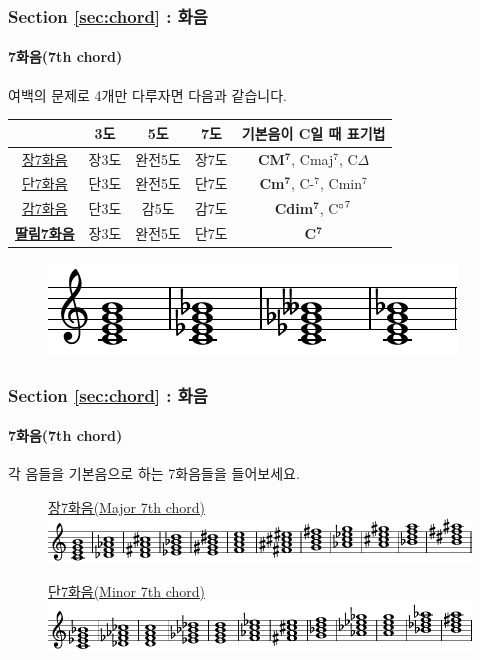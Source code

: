 \documentclass{beamer}
\begin{document}
	\begin{frame}
		\frametitle{Section \ref{sec:chord} : 화음}
		\framesubtitle{7화음(7th chord)}
		여백의 문제로 4개만 다루자면 다음과 같습니다.
		\begin{table}
			\begin{tabular}{|c|c|c|c|c|}
				\hline
				& 3도 & 5도 & 7도 & 기본음이 C일 때 표기법 \\ \hline
				\color{cyan}\href{run:res/mp3/9/chord/7th/C_major_7.mp3}{장7화음} & 장3도 & 완전5도 & 장7도 & {\bf CM$\mathbf{^7}$}, Cmaj$^7$,  C$\Delta$\\ \hline
				\color{cyan}\href{run:res/mp3/9/chord/7th/C_minor_7.mp3}{단7화음} & 단3도 & 완전5도 & 단7도 &{\bf Cm$\mathbf{^7}$}, C-$^7$, Cmin$^7$\\ \hline
				\color{cyan}\href{run:res/mp3/9/chord/7th/C_diminished_7.mp3}{감7화음} & 단3도 & 감5도 & 감7도 & {\bf Cdim$\mathbf{^7}$}, C${\degree}^7$\\ \hline
				\color{cyan}\href{run:res/mp3/9/chord/7th/C_dominant_7.mp3}{\bf 딸림7화음} & 장3도 & 완전5도 & 단7도 & \bf C$\mathbf{^7}$\\ \hline
			\end{tabular}
		\end{table}
		\vskip -1.5pc
		\begin{figure}
			\centering
			\includegraphics[width=\textwidth]{res/pdf/9/chord/7th.pdf}
		\end{figure}
	\end{frame}
	
	\begin{frame}
		\frametitle{Section \ref{sec:chord} : 화음}
		\framesubtitle{7화음(7th chord)}
		각 음들을 기본음으로 하는 7화음들을 들어보세요.
		\begin{figure}
			\centering
			\color{cyan}\href{run:res/mp3/9/scale/chromatic_major_7th_chord.mp3}{장7화음(Major 7th chord)}
			\includegraphics[width=\textwidth]{res/pdf/9/scale/major_7th.pdf}
		\end{figure}
		\begin{figure}
			\centering
			\color{cyan}\href{run:res/mp3/9/scale/chromatic_minor_7th_chord.mp3}{단7화음(Minor 7th chord)}
			\includegraphics[width=\textwidth]{res/pdf/9/scale/minor_7th.pdf}
		\end{figure}
	\end{frame}
	
\end{document}
